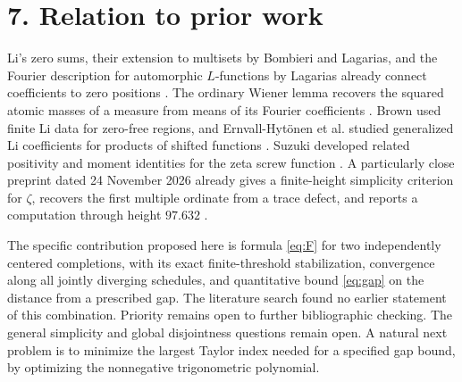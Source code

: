 \documentclass[11pt,letterpaper]{article}
\newcommand{\HH}[1]{\section*{\color{ink}#1}}
\begin{document}
\newpage
\HH{7. Relation to prior work}
Li's zero sums, their extension to multisets by Bombieri and Lagarias, and
the Fourier description for automorphic $L$-functions by Lagarias already
connect coefficients to zero positions \cite{bl,lagarias}. The ordinary
Wiener lemma recovers the squared atomic masses of a measure from means
of its Fourier coefficients \cite{wiener}. Brown used finite Li data for
zero-free regions, and Ernvall-Hyt\"onen et al. studied generalized Li coefficients
for products of shifted functions \cite{brown,modified}. Suzuki developed related
positivity and moment identities for the zeta screw function \cite{suzuki}.
A particularly close preprint dated 24 November 2026 already gives a
finite-height simplicity criterion for $\zeta$, recovers the first multiple
ordinate from a trace defect, and reports a computation through height
$97.632$ \cite{trace}.

The specific contribution proposed here is formula \eqref{eq:F} for two
independently centered completions, with its exact finite-threshold
stabilization, convergence along all jointly diverging schedules, and
quantitative bound \eqref{eq:gap} on the distance from a prescribed gap.
The literature search found no earlier statement of this combination.
Priority remains open to further bibliographic checking. The general
simplicity and global disjointness questions remain open. A natural next
problem is to minimize the largest Taylor index needed for a specified
gap bound, by optimizing the nonnegative trigonometric polynomial.
\end{document}
